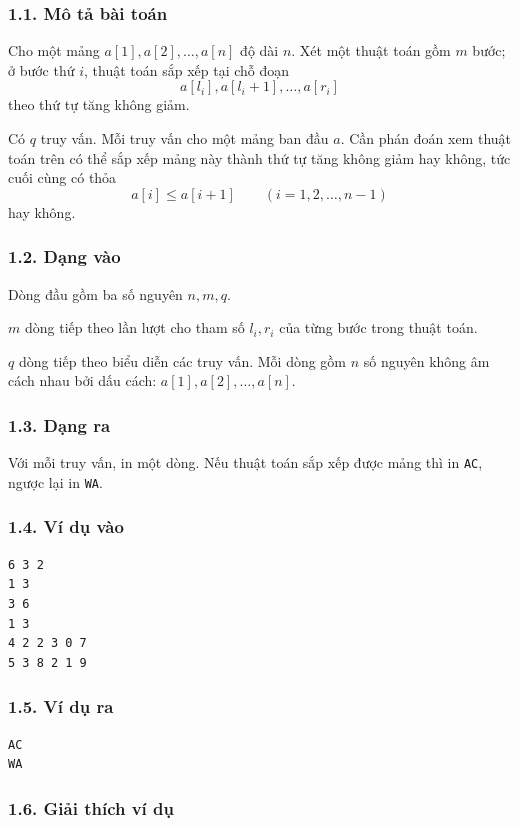 \documentclass[11pt]{article}
\begin{document}
\subsubsection*{1.1. Mô tả bài toán}

Cho một mảng \(a[1],a[2],\ldots,a[n]\) độ dài \(n\). Xét một thuật toán gồm
\(m\) bước; ở bước thứ \(i\), thuật toán sắp xếp tại chỗ đoạn
\[
  a[l_i],a[l_i+1],\ldots,a[r_i]
\]
theo thứ tự tăng không giảm.

Có \(q\) truy vấn. Mỗi truy vấn cho một mảng ban đầu \(a\). Cần phán đoán xem
thuật toán trên có thể sắp xếp mảng này thành thứ tự tăng không giảm hay
không, tức cuối cùng có thỏa
\[
  a[i]\le a[i+1]\qquad (i=1,2,\ldots,n-1)
\]
hay không.

\subsubsection*{1.2. Dạng vào}

Dòng đầu gồm ba số nguyên \(n,m,q\).

\(m\) dòng tiếp theo lần lượt cho tham số \(l_i,r_i\) của từng bước trong thuật
toán.

\(q\) dòng tiếp theo biểu diễn các truy vấn. Mỗi dòng gồm \(n\) số nguyên không
âm cách nhau bởi dấu cách: \(a[1],a[2],\ldots,a[n]\).

\subsubsection*{1.3. Dạng ra}

Với mỗi truy vấn, in một dòng. Nếu thuật toán sắp xếp được mảng thì in
\texttt{AC}, ngược lại in \texttt{WA}.

\subsubsection*{1.4. Ví dụ vào}

\begin{verbatim}
6 3 2
1 3
3 6
1 3
4 2 2 3 0 7
5 3 8 2 1 9
\end{verbatim}

\subsubsection*{1.5. Ví dụ ra}

\begin{verbatim}
AC
WA
\end{verbatim}

\subsubsection*{1.6. Giải thích ví dụ}
\end{document}
